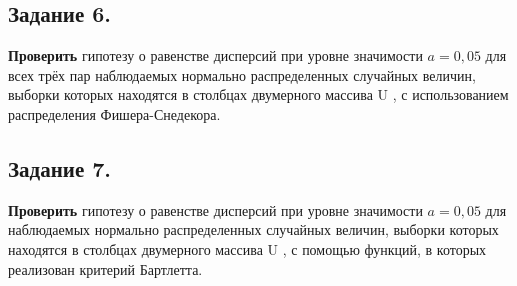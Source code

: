 \subsection{Задание 6.}
\textbf{Проверить} гипотезу о равенстве дисперсий при уровне значимости $a=0,05$
для всех трёх пар наблюдаемых нормально распределенных случайных
величин, выборки которых находятся в столбцах двумерного массива U , с
использованием распределения Фишера-Снедекора.


\subsection{Задание 7.}
\textbf{Проверить} гипотезу о равенстве дисперсий при уровне значимости $a=0,05$
для наблюдаемых нормально распределенных случайных величин,
выборки которых находятся в столбцах двумерного массива U , с помощью
функций, в которых реализован критерий Бартлетта.
